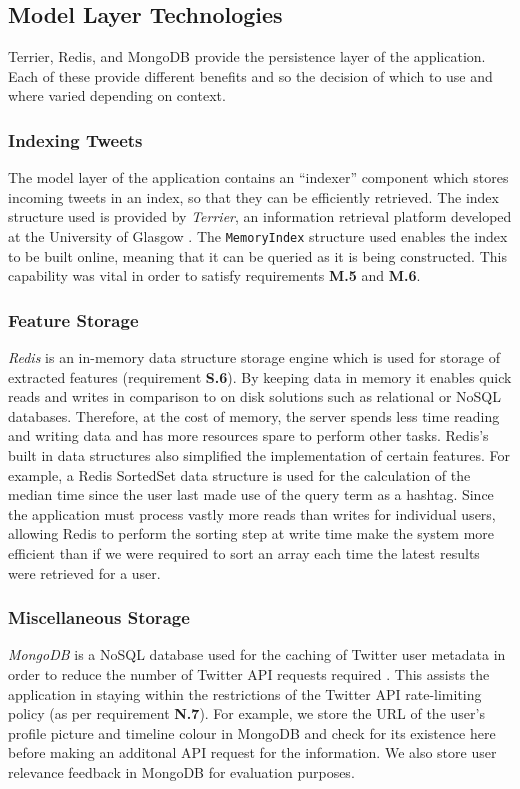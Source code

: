 \documentclass{l4proj}
\newcommand{\code}[1]{\texttt{#1}}
\begin{document}
    \subsection{Model Layer Technologies}
    Terrier, Redis, and MongoDB provide the persistence layer of the application. Each of these provide different benefits and so the decision of which to use and where varied depending on context.
    
        \subsubsection{Indexing Tweets}
        The model layer of the application contains an ``indexer'' component which stores incoming tweets in an index, so that they can be efficiently retrieved. The index structure used is provided by \textit{Terrier}, an information retrieval platform developed at the University of Glasgow \cite{macdonald2012puppy}. The \code{MemoryIndex} structure used enables the index to be built online, meaning that it can be queried as it is being constructed. This capability was vital in order to satisfy requirements \textbf{M.5} and \textbf{M.6}.
        
        \subsubsection{Feature Storage}
        \textit{Redis} is an in-memory data structure storage engine which is used for storage of extracted features (requirement \textbf{S.6})\cite{redis}. By keeping data in memory it enables quick reads and writes in comparison to on disk solutions such as relational or NoSQL databases. Therefore, at the cost of memory, the server spends less time reading and writing data and has more resources spare to perform other tasks. Redis's built in data structures also simplified the implementation of certain features. For example, a Redis SortedSet data structure is used for the calculation of the median time since the user last made use of the query term as a hashtag. Since the application must process vastly more reads than writes for individual users, allowing Redis to perform the sorting step at write time make the system more efficient than if we were required to sort an array each time the latest results were retrieved for a user.
        
         \subsubsection{Miscellaneous Storage}
         \textit{MongoDB} is a NoSQL database used for the caching of Twitter user metadata in order to reduce the number of Twitter API requests required \cite{mongo}. This assists the application in staying within the restrictions of the Twitter API rate-limiting policy (as per requirement \textbf{N.7}). For example, we store the URL of the user's profile picture and timeline colour in MongoDB and check for its existence here before making an additonal API request for the information. We also store user relevance feedback in MongoDB for evaluation purposes.
         
\end{document}

